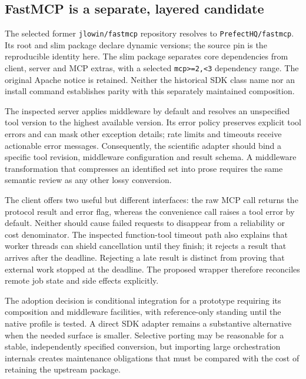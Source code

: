 \subsection{FastMCP is a separate, layered candidate}

The selected former \texttt{jlowin/fastmcp} repository resolves to
\texttt{PrefectHQ/fastmcp}. Its root and slim package declare dynamic versions;
the source pin is the reproducible identity here. The slim package separates
core dependencies from client, server and MCP extras, with a selected
\texttt{mcp>=2,<3} dependency range. The original Apache notice is retained.
Neither the historical SDK class name nor an install command establishes
parity with this separately maintained composition.
\citep{exec24_mcp_fastmcp}

The inspected server applies middleware by default and resolves an unspecified
tool version to the highest available version. Its error policy preserves
explicit tool errors and can mask other exception details; rate limits and
timeouts receive actionable error messages. Consequently, the scientific
adapter should bind a specific tool revision, middleware configuration and
result schema. A middleware transformation that compresses an identified
set into prose requires the same semantic review as any other lossy
conversion.\citep{exec24_mcp_fastmcp,exec24_mcp_contracts}

The client offers two useful but different interfaces: the raw MCP call
returns the protocol result and error flag, whereas the convenience call
raises a tool error by default. Neither should cause failed requests to
disappear from a reliability or cost denominator. The inspected function-tool
timeout path also explains that worker threads can shield cancellation until
they finish; it rejects a result that arrives after the deadline. Rejecting
a late result is distinct from proving that external work stopped at the
deadline. The proposed wrapper therefore reconciles remote job state and
side effects explicitly.\citep{exec24_mcp_fastmcp}

The adoption decision is conditional integration for a prototype requiring
its composition and middleware facilities, with reference-only standing
until the native profile is tested. A direct SDK adapter remains a substantive
alternative when the needed surface is smaller. Selective porting may be
reasonable for a stable, independently specified conversion, but importing
large orchestration internals creates maintenance obligations that must be
compared with the cost of retaining the upstream package.
\citep{exec24_mcp_contracts}

